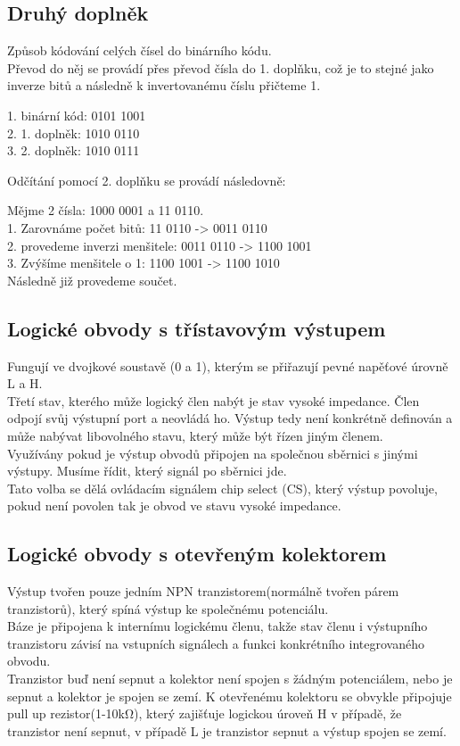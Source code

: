 \subsection{Druhý doplněk}
Způsob kódování celých čísel do binárního kódu. \\
Převod do něj se provádí přes převod čísla do 1. doplňku, což je to stejné jako inverze bitů a následně k invertovanému číslu přičteme 1.
\begin{center}
    1. binární kód: 0101 1001\\
    2. 1. doplněk:  1010 0110\\
    3. 2. doplněk:  1010 0111\\
\end{center}
Odčítání pomocí 2. doplňku se provádí následovně:
\begin{center}
    Mějme 2 čísla: 1000 0001 a 11 0110.\\
    1. Zarovnáme počet bitů: 11 0110 -> 0011 0110\\
    2. provedeme inverzi menšitele: 0011 0110 -> 1100 1001\\
    3. Zvýšíme menšitele o 1: 1100 1001 -> 1100 1010\\
    Následně již provedeme součet.
\end{center}
\subsection{Logické obvody s třístavovým výstupem}
Fungují ve dvojkové soustavě (0 a 1), kterým se přiřazují pevné napěťové úrovně L a H.\\
Třetí stav, kterého může logický člen nabýt je stav vysoké impedance. Člen odpojí svůj výstupní port a neovládá ho. Výstup tedy není konkrétně definován a může nabývat libovolného stavu, který může být řízen jiným členem.\\
Využívány pokud je výstup obvodů připojen na společnou sběrnici s jinými výstupy. Musíme řídit, který signál po sběrnici jde.\\
Tato volba se dělá ovládacím signálem chip select (CS), který výstup povoluje, pokud není povolen tak je obvod ve stavu vysoké impedance.\\

\subsection{Logické obvody s otevřeným kolektorem}
Výstup tvořen pouze jedním NPN tranzistorem(normálně tvořen párem tranzistorů), který spíná výstup ke společnému potenciálu. \\
Báze je připojena k internímu logickému členu, takže stav členu i výstupního tranzistoru závisí na vstupních signálech a funkci konkrétního integrovaného obvodu. \\
Tranzistor buď není sepnut a kolektor není spojen s žádným potenciálem, nebo je sepnut a kolektor je spojen se zemí. K otevřenému kolektoru se obvykle připojuje pull up rezistor(1-10kΩ), který zajišťuje logickou úroveň H v případě, že tranzistor není sepnut, v případě L je tranzistor sepnut a výstup spojen se zemí.

